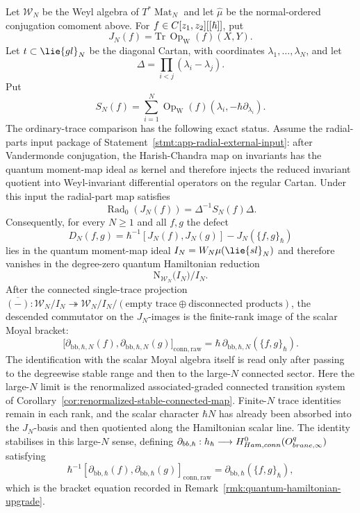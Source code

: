 \documentclass[11pt]{memoir}
\begin{document}
\begin{thm}\label{thm:finite-n-reduced-moyal}
  \label{thm:reduced-moyal-commutator}%
  Let $\mathcal W_N$ be the Weyl algebra of
  $T^*\operatorname{Mat}_N$ and let $\widehat\mu$ be the normal-ordered
  conjugation comoment above. For
  $f\in C[z_1,z_2][[\hbar]]$, put
  $$J_N(f)=\mathrm{Tr}\,\operatorname{Op}_{\mathrm W}(f)(X,Y).$$
  Let $\mathfrak t\subset\lie{gl}_N$ be the diagonal Cartan, with coordinates
  $\lambda_1,\ldots,\lambda_N$, and let
  $$\Delta=\prod_{i<j}(\lambda_i-\lambda_j).$$
  Put
  $$S_N(f)=\sum_{i=1}^N
      \operatorname{Op}_{\mathrm W}
        (f)(\lambda_i,-\hbar\partial_{\lambda_i}).$$
  The ordinary-trace comparison has the following exact status.  Assume
  the radial-parts input package of
  Statement~\ref{stmt:app-radial-external-input}: after
  Vandermonde conjugation, the Harish-Chandra map on invariants has the
  quantum moment-map ideal as kernel and therefore injects the reduced
  invariant quotient into Weyl-invariant differential operators on the
  regular Cartan.  Under this input the radial-part map satisfies
  $$\operatorname{Rad}_0(J_N(f))=\Delta^{-1}S_N(f)\Delta.$$
  Consequently, for every $N\geq 1$ and all $f,g$ the defect
  $$D_N(f,g)=
    \hbar^{-1}[J_N(f),J_N(g)]-J_N(\{f,g\}_\hbar)$$
  lies in the quantum moment-map ideal $I_N=\mathcal W_N\widehat\mu(\lie{sl}_N)$
  and therefore vanishes in the degree-zero quantum Hamiltonian reduction
  $$\mathrm N_{\mathcal W_N}\bigl(I_N\bigr)/I_N.$$
  After the connected single-trace projection
  $\overline{(-)}\colon\mathcal W_N/I_N\twoheadrightarrow
   \mathcal W_N/I_N\big/(\text{empty trace}\oplus\text{disconnected products})$,
  the descended commutator on the \(J_N\)-images is the finite-rank
  image of the scalar Moyal bracket:
  $$\bigl[\partial_{\mathrm{bb},\hbar,N}(f),
    \partial_{\mathrm{bb},\hbar,N}(g)\bigr]_{\mathrm{conn,raw}}
    =\hbar\,\partial_{\mathrm{bb},\hbar,N}(\{f,g\}_\hbar).$$
  The identification with the scalar Moyal algebra itself is read only
  after passing to the degreewise stable range and then to the
  large-\(N\) connected sector.
  Here the large-\(N\) limit is the renormalized associated-graded
  connected transition system of
  Corollary~\ref{cor:renormalized-stable-connected-map}. Finite-\(N\)
  trace identities remain in each rank, and the scalar character
  \(\hbar N\) has already been absorbed into the \(J_N\)-basis and then
  quotiented along the Hamiltonian scalar line. The identity stabilises
  in this large-\(N\) sense, defining
  $\partial_{bb,\hbar}:h_\hbar\longrightarrow
    H^0_{Ham,conn}(O^{q}_{brane,\infty})$
  satisfying
  $$\hbar^{-1}[\partial_{\mathrm{bb},\hbar}(f),
    \partial_{\mathrm{bb},\hbar}(g)]_{\mathrm{conn,raw}}
    =\partial_{\mathrm{bb},\hbar}(\{f,g\}_\hbar),$$
	  which is the bracket equation recorded in
	  Remark~\ref{rmk:quantum-hamiltonian-upgrade}.


\end{thm}
\end{document}
